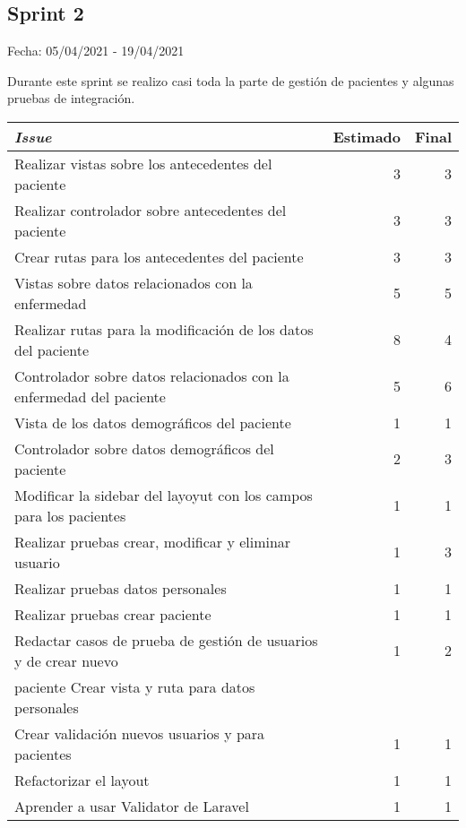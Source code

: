 \subsection{Sprint 2}

Fecha: 05/04/2021 - 19/04/2021

Durante este sprint se realizo casi toda la parte de gestión de pacientes y algunas pruebas de integración.


\begin{table}[H]
	 \begin{tabularx}{\linewidth}{X r r}
	 	\toprule \textbf{\textit{Issue}} & \textbf{Estimado} & \textbf{Final}\\
	 	\toprule
	 	Realizar vistas sobre los antecedentes del paciente & 3 & 3 \\
        Realizar controlador sobre antecedentes del paciente & 3 & 3 \\
        Crear rutas para los antecedentes del paciente & 3 & 3 \\
        Vistas sobre datos relacionados con la enfermedad & 5 & 5 \\
        Realizar rutas para la modificación de los datos del paciente & 8 & 4  \\
        Controlador sobre datos relacionados con la enfermedad del paciente & 5 & 6 \\
        Vista de los datos demográficos del paciente & 1 & 1 \\
        Controlador sobre datos demográficos del paciente & 2 & 3 \\
        Modificar la sidebar del layoyut con los campos para los pacientes & 1  & 1 \\
        Realizar pruebas crear, modificar y eliminar usuario & 1 & 3 \\
        Realizar pruebas datos personales & 1 & 1 \\
        Realizar pruebas crear paciente & 1 & 1 \\
        Redactar casos de prueba de gestión de usuarios y de crear nuevo & 1 & 2 \\ paciente 
        Crear vista y ruta para datos personales &  &  \\
        Crear validación nuevos usuarios y para pacientes & 1 & 1 \\
        Refactorizar el layout & 1 & 1 \\
        Aprender a usar Validator de Laravel & 1 & 1 \\

\end{tabularx}
\end{table}
